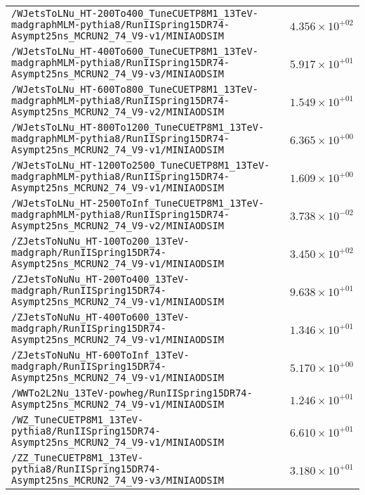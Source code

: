 \begin{center}
\begin{tabular}{ll}
\verb!/WJetsToLNu_HT-200To400_TuneCUETP8M1_13TeV-madgraphMLM-pythia8/RunIISpring15DR74-Asympt25ns_MCRUN2_74_V9-v1/MINIAODSIM! &$4.356\times 10^{+02}$\tabularnewline
\verb!/WJetsToLNu_HT-400To600_TuneCUETP8M1_13TeV-madgraphMLM-pythia8/RunIISpring15DR74-Asympt25ns_MCRUN2_74_V9-v3/MINIAODSIM! &$5.917\times 10^{+01}$\tabularnewline
\verb!/WJetsToLNu_HT-600To800_TuneCUETP8M1_13TeV-madgraphMLM-pythia8/RunIISpring15DR74-Asympt25ns_MCRUN2_74_V9-v2/MINIAODSIM! &$1.549\times 10^{+01}$\tabularnewline
\verb!/WJetsToLNu_HT-800To1200_TuneCUETP8M1_13TeV-madgraphMLM-pythia8/RunIISpring15DR74-Asympt25ns_MCRUN2_74_V9-v1/MINIAODSIM! &$6.365\times 10^{+00}$\tabularnewline
\verb!/WJetsToLNu_HT-1200To2500_TuneCUETP8M1_13TeV-madgraphMLM-pythia8/RunIISpring15DR74-Asympt25ns_MCRUN2_74_V9-v1/MINIAODSIM! &$1.609\times 10^{+00}$\tabularnewline
\verb!/WJetsToLNu_HT-2500ToInf_TuneCUETP8M1_13TeV-madgraphMLM-pythia8/RunIISpring15DR74-Asympt25ns_MCRUN2_74_V9-v2/MINIAODSIM! &$3.738\times 10^{-02}$\tabularnewline
\verb!/ZJetsToNuNu_HT-100To200_13TeV-madgraph/RunIISpring15DR74-Asympt25ns_MCRUN2_74_V9-v1/MINIAODSIM! &$3.450\times 10^{+02}$\tabularnewline
\verb!/ZJetsToNuNu_HT-200To400_13TeV-madgraph/RunIISpring15DR74-Asympt25ns_MCRUN2_74_V9-v1/MINIAODSIM! &$9.638\times 10^{+01}$\tabularnewline
\verb!/ZJetsToNuNu_HT-400To600_13TeV-madgraph/RunIISpring15DR74-Asympt25ns_MCRUN2_74_V9-v1/MINIAODSIM! &$1.346\times 10^{+01}$\tabularnewline
\verb!/ZJetsToNuNu_HT-600ToInf_13TeV-madgraph/RunIISpring15DR74-Asympt25ns_MCRUN2_74_V9-v1/MINIAODSIM! &$5.170\times 10^{+00}$\tabularnewline
\verb!/WWTo2L2Nu_13TeV-powheg/RunIISpring15DR74-Asympt25ns_MCRUN2_74_V9-v1/MINIAODSIM! &$1.246\times 10^{+01}$\tabularnewline
\verb!/WZ_TuneCUETP8M1_13TeV-pythia8/RunIISpring15DR74-Asympt25ns_MCRUN2_74_V9-v1/MINIAODSIM! &$6.610\times 10^{+01}$\tabularnewline
\verb!/ZZ_TuneCUETP8M1_13TeV-pythia8/RunIISpring15DR74-Asympt25ns_MCRUN2_74_V9-v3/MINIAODSIM! &$3.180\times 10^{+01}$\tabularnewline
\hline
\end{tabular}\end{center}
